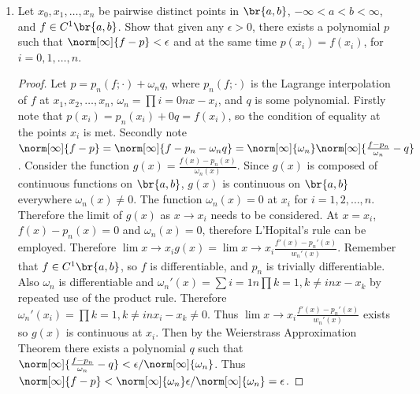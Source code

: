\documentclass[11pt]{article}
\begin{document}
\begin{enumerate}
    \item %
        Let $x_0, x_1, \ldots, x_n$ be pairwise distinct points in $\br{a, b}$,
        $-\infty < a < b < \infty$, and $f \in C^1\br{a, b}$.
        Show that given any $\epsilon > 0$, there exists a polynomial $p$ such
        that $\norm[\infty]{f - p} < \epsilon$ and at the same time $p(x_i) =
        f(x_i)$, for $i = 0, 1, \ldots, n$.
        \begin{proof}
            Let $p = p_n(f;\cdot) + \omega_n q$, where $p_n(f;\cdot)$ is the
            Lagrange interpolation of $f$ at $x_1, x_2, \ldots, x_n$,
            $\omega_n = \prod{i=0}{n}{x - x_i}$, and $q$ is some polynomial.
            Firstly note that $p(x_i) = p_n(x_i) + 0 q = f(x_i)$, so the condition
            of equality at the points $x_i$ is met.
            Secondly note $\norm[\infty]{f - p} =
            \norm[\infty]{f - p_n - \omega_n q} = \norm[\infty]{\omega_n}
            \norm[\infty]{\frac{f - p_n}{\omega_n} - q}$.
            Consider the function $g(x) = \frac{f(x) - p_n(x)}{\omega_n(x)}$.
            Since $g(x)$ is composed of continuous functions on $\br{a, b}$,
            $g(x)$ is continuous on $\br{a, b}$ everywhere $\omega_n(x) \neq 0$.
            The function $\omega_n(x) = 0$ at $x_i$ for $i = 1, 2, \ldots, n$.
            Therefore the limit of $g(x)$ as $x \to x_i$ needs to be considered.
            At $x = x_i$, $f(x) - p_n(x) = 0$ and $\omega_n(x) = 0$, therefore
            L'Hopital's rule can be employed.
            Therefore $\lim{x \to x_i}{g(x)} =
            \lim{x \to x_i}{\frac{f'(x)- p_n'(x)}{w_n'(x)}}$.
            Remember that $f \in C^1\br{a, b}$, so $f$ is differentiable, and
            $p_n$ is trivially differentiable.
            Also $\omega_n$ is differentiable and $\omega_n'(x) =
            \sum{i = 1}{n}{\prod{k = 1, k \neq i}{n}{x - x_k}}$ by repeated
            use of the product rule.
            Therefore $\omega_n'(x_i) = \prod{k=1, k \neq i}{n}{x_i - x_k} \neq 0$.
            Thus $\lim{x \to x_i}{\frac{f'(x)- p_n'(x)}{w_n'(x)}}$ exists so
            $g(x)$ is continuous at $x_i$.
            Then by the Weierstrass Approximation Theorem there exists a polynomial
            $q$ such that $\norm[\infty]{\frac{f - p_n}{\omega_n} - q} <
            \epsilon/\norm[\infty]{\omega_n}$.
            Thus $\norm[\infty]{f - p} < 
            \norm[\infty]{\omega_n} \epsilon/\norm[\infty]{\omega_n} = \epsilon$.
        \end{proof}


\end{enumerate}
\end{document}
